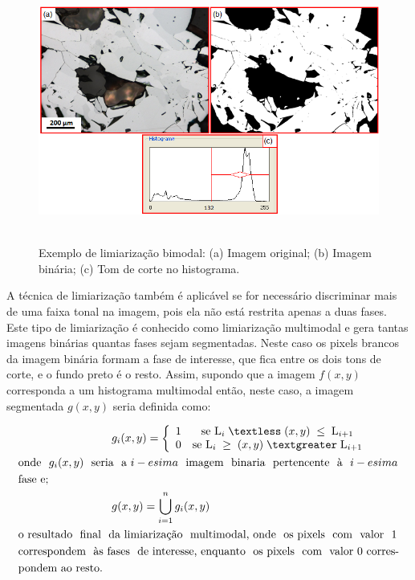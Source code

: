 \begin{figure} [h]
  \begin{center}
    \includegraphics[height=245pt,width=400pt]{images/fig_lim-bimod}
    \caption{Exemplo de limiarização bimodal: (a) Imagem original; (b)
      Imagem binária; (c) Tom de corte no
      histograma.}\label{fig:lim-bimod}
  \end{center}
\end{figure}

A técnica de limiarização também é aplicável se for necessário
discriminar mais de uma faixa tonal na imagem, pois ela não está
restrita apenas a duas fases. Este tipo de limiarização é conhecido
como limiarização multimodal e gera tantas imagens binárias quantas
fases sejam segmentadas. Neste caso os pixels brancos da imagem
binária formam a fase de interesse, que fica entre os dois tons de
corte, e o fundo preto é o resto. Assim, supondo que a imagem $f(x,y)$
corresponda a um histograma multimodal então, neste caso, a imagem
segmentada $g(x,y)$ seria definida como:

\begin{align}
&~~~~~~~~~~~~~~~~~~~~~~~~~g_{i}(x,y) =  \left\lbrace
	\begin{array}{c c} 
		1  
		& \text{se } \text{L}_{i} \; \textless \; (x,y) \; \le \; \text{L}_{i+1} \\  
		0  
		& \text{se }\text{L}_{i} \; \ge \; (x,y) \; \textgreater \; \text{L}_{i+1}
	\end{array}\right. \\
&\text{onde ~$g_{i}(x,y)$ ~seria ~a $i-esima$ ~imagem ~binaria ~pertencente ~à ~$i-esima$} \nonumber\\
&\text{fase e;} \nonumber\\
&~~~~~~~~~~~~~~~~~~~~~~~~~g(x,y) = \bigcup\limits_{i=1}^n g_{i}(x,y) \\
&\text{o resultado ~final ~da limiarização ~multimodal, onde ~os pixels ~com ~valor ~$1$} \nonumber\\
&\text{correspondem ~às fases ~de interesse, enquanto ~os pixels ~com ~valor $0$ corres-} \nonumber\\
&\text{pondem ao resto.} \nonumber
\end{align}

